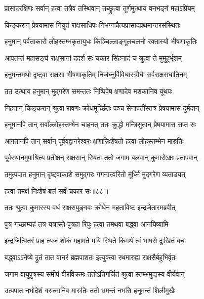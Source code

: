 \twolineshloka
{प्रासादरक्षिणः सर्वान् हत्वा तत्रैव तस्थिवान्}
{तच्छ्रुत्वा तूर्णमुत्थाय वनभङ्गं महाऽप्रियम्} %

\twolineshloka
{किङ्करान् प्रेषयामास नियुतं राक्षसाधिपः}
{निभग्नचैत्यप्रासादप्रथमान्तरसंस्थितः} %

\twolineshloka
{हनुमान् पर्वताकारो लोहस्तम्भकृतायुधः}
{किञ्चिल्लाङ्गूलचलनो रक्तास्यो भीषणाकृतिः} %

\twolineshloka
{आपतन्तं महासङ्घं राक्षसानां ददर्श सः}
{चकार सिंहनादं च श्रुत्वा ते मुमुहुर्भृशम्} %

\twolineshloka
{हनुमन्तमथो दृष्ट्वा राक्षसा भीषणाकृतिम्}
{निर्जघ्नुर्विविधास्त्रौघैः सर्वराक्षसघातिनम्} %

\twolineshloka
{तत उत्थाय हनुमान् मुद्गरेण समन्ततः}
{निष्पिपेष क्षणादेव मशकानिव यूथपः} %

\twolineshloka
{निहतान् किङ्करान् श्रुत्वा रावणः क्रोधमूर्च्छितः}
{पञ्च सेनापतींस्तत्र प्रेषयामास दुर्मदान्} %

\twolineshloka
{हनूमानपि तान् सर्वांल्लोहस्तम्भेन चाहनत्}
{ततः क्रुद्धो मन्त्रिसुतान् प्रेषयामास सप्त सः} %

\twolineshloka
{आगतानपि तान् सर्वान् पूर्ववद्वानरेश्वरः}
{क्षणान्निःशेषतो हत्वा लोहस्तम्भेन मारुतिः} %

\twolineshloka
{पूर्वस्थानमुपाश्रित्य प्रतीक्षन् राक्षसान् स्थितः}
{ततो जगाम बलवान् कुमारोऽक्षः प्रतापवान्} %

\twolineshloka
{तमुत्पपात हनुमान् दृष्ट्वाकाशे समुद्गरः}
{गगनात्त्वरितो मूर्ध्नि मुद्गरेण व्यताडयत्} %

{हत्वा तमक्षं निःशेषं बलं सर्वं चकार सः॥८८॥} %


\twolineshloka
{ततः श्रुत्वा कुमारस्य वधं राक्षसपुङ्गवः}
{क्रोधेन महताविष्ट इन्द्रजेतारमब्रवीत्} %

\twolineshloka
{पुत्र गच्छाम्यहं तत्र यत्रास्ते पुत्रहा रिपुः}
{हत्वा तमथवा बद्ध्वा आनयिष्यामि} %

\twolineshloka
{इन्द्रजित्पितरं प्राह त्यज शोकं महामते}
{मयि स्थिते किमर्थं त्वं भाषसे दुःखितं वचः} %

\twolineshloka
{बद्ध्वाऽऽनेष्ये द्रुतं तात वानरं ब्रह्मपाशतः}
{इत्युक्त्वा रथमारुह्य राक्षसैर्बहुभिर्वृतः} %

\twolineshloka
{जगाम वायुपुत्रस्य समीपं वीरविक्रमः}
{ततोऽतिगर्जितं श्रुत्वा स्तम्भमुद्यस्य वीर्यवान्} %

\twolineshloka
{उत्पपात नभोदेशं गरुत्मानिव मारुतिः}
{ततो भ्रमन्तं नभसि हनूमन्तं शिलीमुखैः} %

